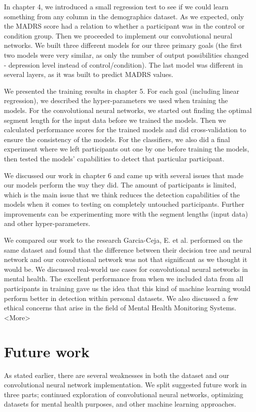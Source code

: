 In chapter 4, we introduced a small regression test to see if we could learn something from any column in the demographics dataset. As we expected, only the MADRS score had a relation to whether a participant was in the control or condition group. Then we proceeded to implement our convolutional neural networks. We built three different models for our three primary goals (the first two models were very similar, as only the number of output possibilities changed - depression level instead of control/condition). The last model was different in several layers, as it was built to predict MADRS values. 

We presented the training results in chapter 5. For each goal (including linear regression), we described the hyper-parameters we used when training the models. For the convolutional neural networks, we started out finding the optimal segment length for the input data before we trained the models. Then we calculated performance scores for the trained models and did cross-validation to ensure the consistency of the models. For the classifiers, we also did a final experiment where we left participants out one by one before training the models, then tested the models' capabilities to detect that particular participant.

We discussed our work in chapter 6 and came up with several issues that made our models perform the way they did. The amount of participants is limited, which is the main issue that we think reduces the detection capabilities of the models when it comes to testing on completely untouched participants. Further improvements can be experimenting more with the segment lengths (input data) and other hyper-parameters. 

We compared our work to the research Garcia-Ceja, E. et al. performed on the same dataset and found that the difference between their decision tree and neural network and our convolutional network was not that significant as we thought it would be. We discussed real-world use cases for convolutional neural networks in mental health. The excellent performance from when we included data from all participants in training gave us the idea that this kind of machine learning would perform better in detection within personal datasets. We also discussed a few ethical concerns that arise in the field of Mental Health Monitoring Systems. <More>

\section{Future work}
As stated earlier, there are several weaknesses in both the dataset and our convolutional neural network implementation. We split suggested future work in three parts; continued exploration of convolutional neural networks, optimizing datasets for mental health purposes, and other machine learning approaches. 


